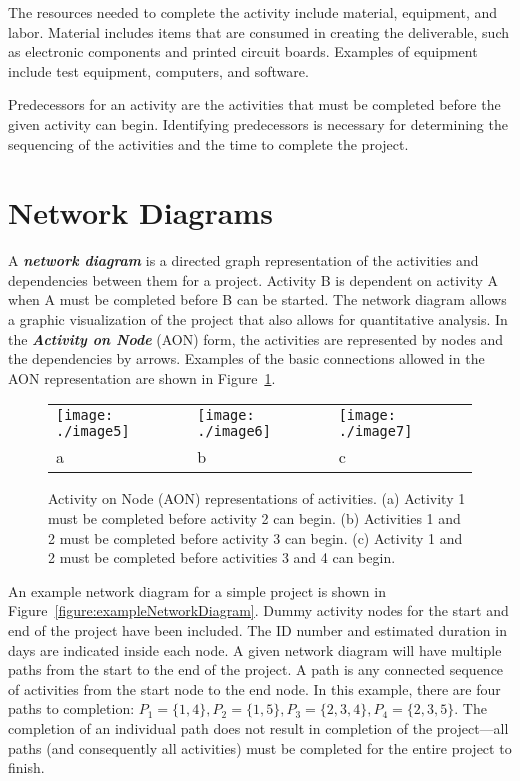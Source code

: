The resources needed to complete the activity include material,
equipment, and labor. Material includes items that are consumed in
creating the deliverable, such as electronic components and printed
circuit boards. Examples of equipment include test equipment, computers,
and software.

Predecessors for an activity are the activities that must be completed
before the given activity can begin. Identifying predecessors is
necessary for determining the sequencing of the activities and the time
to complete the project.

\section{Network Diagrams}
\label{section:network-diagrams}

A \emph{\textbf{network diagram}} is a directed graph representation of
the activities and dependencies between them for a project. Activity B
is dependent on activity A when A must be completed before B can be
started. The network diagram allows a graphic visualization of the
project that also allows for quantitative analysis. In the
\emph{\textbf{Activity on Node}} (AON) form, the activities are
represented by nodes and the dependencies by arrows. Examples of the
basic connections allowed in the AON representation are shown in 
Figure~\ref{figure:activityOnNode}.


\begin{figure}
\begin{tabular}{m{8cm}m{8cm}m{8cm}}
\texttt{[image: ./image5]} &
\texttt{[image: ./image6]} & 
\texttt{[image: ./image7]} \\
a & b & c \\
\end{tabular}

\caption{Activity on Node (AON) representations of
activities. (a) Activity 1 must be completed before activity 2 can
begin. (b) Activities 1 and 2 must be completed before activity 3 can
begin. (c) Activity 1 and 2 must be completed before activities 3 and 4
can begin.}
\label{figure:activityOnNode}
\end{figure}


An example network diagram for a simple project is shown in 
Figure~\ref{figure:exampleNetworkDiagram}.
Dummy activity nodes for the start and end of the project have been
included. The ID number and estimated duration in days are indicated
inside each node. A given network diagram will have multiple paths from
the start to the end of the project. A path is any connected sequence of
activities from the start node to the end node. In this example, there
are four paths to completion:
$P_1 = \{1,4\} , P_2 = \{1,5\}, P_3 = \{2,3,4\}, P_4 = \{2,3,5\}$.
The completion of an individual path does not result in completion of
the project---all paths (and consequently all activities) must be
completed for the entire project to finish.

